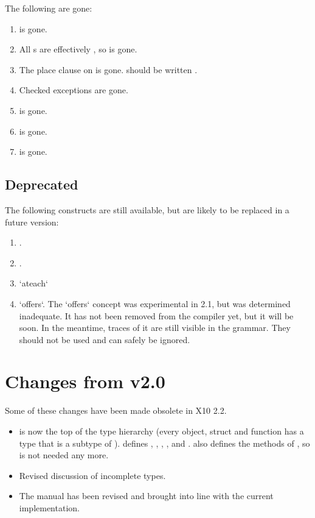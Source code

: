 The following are gone: 

\begin{enumerate}
\item {} is gone.
\item All s are effectively , so  is gone.
\item The place clause on  is gone.   should be
      written .
\item Checked exceptions are gone.
\item {} is gone.
\item {} is gone.
\item {} is gone.

\end{enumerate}

\subsection{Deprecated}

The following constructs are still available, but are likely to be replaced in
a future version: 


\begin{enumerate}
\item {}.
\item {}.
\item \xcd`ateach`
\item \xcd`offers`.    The \xcd`offers` concept was experimental
      in 2.1, but was determined inadequate.  It has not been removed from the
      compiler yet, but it will be soon.  In the meantime, traces of it are
      still visible in the grammar.  They should not be used and can safely be ignored.
\end{enumerate}

\section{Changes from \Xten{} v2.0}
Some of these changes have been made obsolete in X10 2.2.

\begin{itemize}
\item {} is now the top of the type hierarchy (every object,
  struct and function has a type that is a subtype of
  ).  defines , , ,
  ,  and .  also defines the methods
  of , so  is not needed any more.
\item Revised discussion of incomplete types.
\item The manual has been revised and brought into line with the current implementation. 
\end{itemize}
